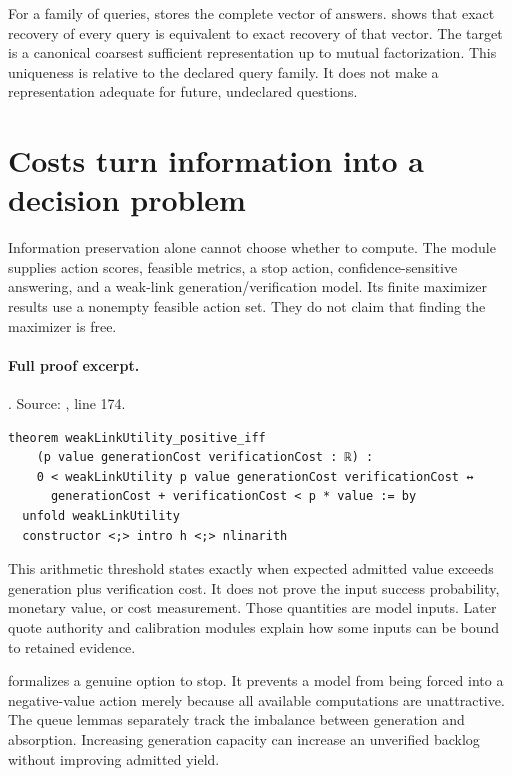 \documentclass[11pt]{article}
\begin{document}
For a family of queries,  stores the complete vector of
answers.  shows that exact recovery of every
query is equivalent to exact recovery of that vector. The target is a
canonical coarsest sufficient representation up to mutual factorization.
This uniqueness is relative to the declared query family. It does not make a
representation adequate for future, undeclared questions.

\section{Costs turn information into a decision problem}
Information preservation alone cannot choose whether to compute. The
 module supplies action scores, feasible metrics, a stop action,
confidence-sensitive answering, and a weak-link generation/verification model.
Its finite maximizer results use a nonempty feasible action set. They do not
claim that finding the maximizer is free.

\paragraph{Full proof excerpt.}. Source: , line 174.
\begin{lstlisting}[style=AVOCSource]
theorem weakLinkUtility_positive_iff
    (p value generationCost verificationCost : ℝ) :
    0 < weakLinkUtility p value generationCost verificationCost ↔
      generationCost + verificationCost < p * value := by
  unfold weakLinkUtility
  constructor <;> intro h <;> nlinarith
\end{lstlisting}


This arithmetic threshold states exactly when expected admitted value exceeds
generation plus verification cost. It does not prove the input success
probability, monetary value, or cost measurement. Those quantities are model
inputs. Later quote authority and calibration modules explain how some inputs
can be bound to retained evidence.

 formalizes a genuine option to stop. It
prevents a model from being forced into a negative-value action merely because
all available computations are unattractive. The queue lemmas separately
track the imbalance between generation and absorption. Increasing generation
capacity can increase an unverified backlog without improving admitted yield.
\end{document}
